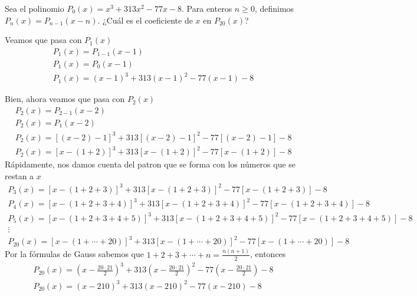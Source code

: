 \begin{section-problem}
    Sea el polinomio $P_0(x) = x^3 + 313x^2 - 77x - 8$.
    Para enteros $n \geq 0$, definimos $P_n(x) = P_{n - 1}(x - n)$.
    ¿Cuál es el coeficiente de $x$ en $P_{20}(x)$?

    \begin{solution}
        Veamos que pasa con $P_1(x)$
        \begin{gather*}
            P_1(x) = P_{1 - 1}(x - 1)\\
            P_1(x) = P_0(x - 1)\\
            P_1(x) = (x - 1)^3 + 313(x - 1)^2 - 77(x - 1) - 8
        \end{gather*}

        Bien, ahora veamos que pasa con $P_2(x)$
        \begin{gather*}
            P_2(x) = P_{2 - 1}(x - 2)\\
            P_2(x) = P_1(x - 2)\\
            P_2(x) = [(x - 2) - 1]^3 + 313[(x - 2) - 1]^2 - 77[(x - 2) - 1] - 8\\
            P_2(x) = [x - (1 + 2)]^3 + 313[x - (1 + 2)]^2 - 77[x - (1 + 2)] - 8
        \end{gather*}
        Rápidamente, nos damos cuenta del patron que se forma con los números que se restan a $x$
        \begin{gather*}
            P_3(x) = [x - (1 + 2 + 3)]^3 + 313[x - (1 + 2 + 3)]^2 - 77[x - (1 + 2 + 3)] - 8\\
            P_4(x) = [x - (1 + 2 + 3 + 4)]^3 + 313[x - (1 + 2 + 3 + 4)]^2 - 77[x - (1 + 2 + 3 + 4)] - 8\\
            P_5(x) = [x - (1 + 2 + 3 + 4 + 5)]^3 + 313[x - (1 + 2 + 3 + 4 + 5)]^2 - 77[x - (1 + 2 + 3 + 4 + 5)] - 8\\
            \vdots\\
            P_{20}(x) = [x - (1 + \cdots + 20)]^3 + 313[x - (1 + \cdots + 20)]^2 - 77[x - (1 + \cdots + 20)] - 8
        \end{gather*}
        Por la fórmulas de Gauss sabemos que $1 + 2 + 3 + \cdots + n = \frac{n(n +1)}{2}$, entonces
        \begin{gather*}
            P_{20}(x) = \left(x - \frac{20\cdot21}{2}\right)^3 + 313\left(x - \frac{20\cdot21}{2}\right)^2 - 77\left(x - \frac{20\cdot21}{2}\right) - 8\\
            \boxed{P_{20}(x) = (x - 210)^3 + 313(x - 210)^2 - 77(x - 210) - 8}
        \end{gather*}

\end{solution}
\end{section-problem}
